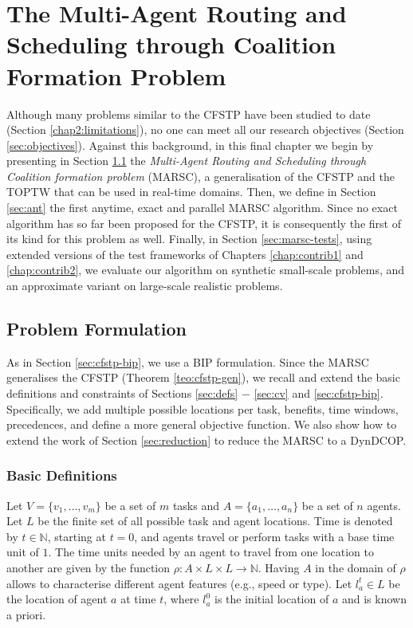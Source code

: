 \chapter{The Multi-Agent Routing and Scheduling through Coalition Formation
Problem}\label{chap:contrib3}

Although many problems similar to the CFSTP have been studied to date (Section
\ref{chap2:limitations}), no one can meet all our research objectives (Section
\ref{sec:objectives}). Against this background, in this final chapter we begin by
presenting in Section \ref{sec:marsc} the \emph{Multi-Agent Routing and Scheduling through
Coalition formation problem} (MARSC), a generalisation of the CFSTP and the TOPTW that can
be used in real-time domains. Then, we define in Section \ref{sec:ant} the first anytime,
exact and parallel MARSC algorithm. Since no exact algorithm has so far been proposed for
the CFSTP, it is consequently the first of its kind for this problem as well. Finally, in
Section \ref{sec:marsc-tests}, using extended versions of the test frameworks of Chapters
\ref{chap:contrib1} and \ref{chap:contrib2}, we evaluate our algorithm on synthetic
small-scale problems, and an approximate variant on large-scale realistic problems.

\section{Problem Formulation}\label{sec:marsc}

As in Section \ref{sec:cfstp-bip}, we use a BIP formulation. Since the MARSC generalises
the CFSTP (Theorem \ref{teo:cfstp-gen}),
we recall and extend the basic definitions and constraints of Sections \ref{sec:defs} $-$
\ref{sec:cv} and \ref{sec:cfstp-bip}.
Specifically, we add multiple possible locations per task, benefits, time windows,
precedences, and define a more general objective function.
We also show how to extend the work of Section \ref{sec:reduction} to reduce the MARSC to
a DynDCOP.

\subsection{Basic Definitions}\label{sec:marsc-defs}

Let $V = \{ v_1, \dots, v_m \}$ be a set of $m$ tasks and $A = \{ a_1, \dots, a_n \}$ be a
set of $n$ agents. Let $L$ be the finite set of all possible task and agent locations.
Time is denoted by $t \in \mathbb{N}$, starting at $t = 0$, and agents travel or perform
tasks with a base time unit of $1$. The time units needed by an agent to travel from one
location to another are given by the function $\rho : A \times L \times L \rightarrow
\mathbb{N}$. Having $A$ in the domain of $\rho$ allows to characterise different agent
features (e.g., speed or type). Let $l_a^t \in L$ be the location of agent $a$ at time
$t$, where $l_a^0$ is the initial location of $a$ and is known a priori.

